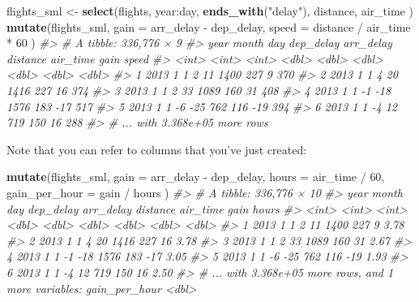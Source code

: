 \documentclass[]{book}
\newenvironment{Shaded}{\begin{snugshade}}{\end{snugshade}}
\newcommand{\KeywordTok}[1]{\textcolor[rgb]{0.13,0.29,0.53}{\textbf{{#1}}}}
\newcommand{\DataTypeTok}[1]{\textcolor[rgb]{0.13,0.29,0.53}{{#1}}}
\newcommand{\DecValTok}[1]{\textcolor[rgb]{0.00,0.00,0.81}{{#1}}}
\newcommand{\StringTok}[1]{\textcolor[rgb]{0.31,0.60,0.02}{{#1}}}
\newcommand{\CommentTok}[1]{\textcolor[rgb]{0.56,0.35,0.01}{\textit{{#1}}}}
\newcommand{\NormalTok}[1]{{#1}}
\begin{document}
\begin{Shaded}
\begin{Highlighting}[]
\NormalTok{flights_sml <-}\StringTok{ }\KeywordTok{select}\NormalTok{(flights, }
  \NormalTok{year:day, }
  \KeywordTok{ends_with}\NormalTok{(}\StringTok{"delay"}\NormalTok{), }
  \NormalTok{distance, }
  \NormalTok{air_time}
\NormalTok{)}
\KeywordTok{mutate}\NormalTok{(flights_sml,}
  \DataTypeTok{gain =} \NormalTok{arr_delay -}\StringTok{ }\NormalTok{dep_delay,}
  \DataTypeTok{speed =} \NormalTok{distance /}\StringTok{ }\NormalTok{air_time *}\StringTok{ }\DecValTok{60}
\NormalTok{)}
\CommentTok{#> # A tibble: 336,776 × 9}
\CommentTok{#>    year month   day dep_delay arr_delay distance air_time  gain speed}
\CommentTok{#>   <int> <int> <int>     <dbl>     <dbl>    <dbl>    <dbl> <dbl> <dbl>}
\CommentTok{#> 1  2013     1     1         2        11     1400      227     9   370}
\CommentTok{#> 2  2013     1     1         4        20     1416      227    16   374}
\CommentTok{#> 3  2013     1     1         2        33     1089      160    31   408}
\CommentTok{#> 4  2013     1     1        -1       -18     1576      183   -17   517}
\CommentTok{#> 5  2013     1     1        -6       -25      762      116   -19   394}
\CommentTok{#> 6  2013     1     1        -4        12      719      150    16   288}
\CommentTok{#> # ... with 3.368e+05 more rows}
\end{Highlighting}
\end{Shaded}

Note that you can refer to columns that you've just created:

\begin{Shaded}
\begin{Highlighting}[]
\KeywordTok{mutate}\NormalTok{(flights_sml,}
  \DataTypeTok{gain =} \NormalTok{arr_delay -}\StringTok{ }\NormalTok{dep_delay,}
  \DataTypeTok{hours =} \NormalTok{air_time /}\StringTok{ }\DecValTok{60}\NormalTok{,}
  \DataTypeTok{gain_per_hour =} \NormalTok{gain /}\StringTok{ }\NormalTok{hours}
\NormalTok{)}
\CommentTok{#> # A tibble: 336,776 × 10}
\CommentTok{#>    year month   day dep_delay arr_delay distance air_time  gain hours}
\CommentTok{#>   <int> <int> <int>     <dbl>     <dbl>    <dbl>    <dbl> <dbl> <dbl>}
\CommentTok{#> 1  2013     1     1         2        11     1400      227     9  3.78}
\CommentTok{#> 2  2013     1     1         4        20     1416      227    16  3.78}
\CommentTok{#> 3  2013     1     1         2        33     1089      160    31  2.67}
\CommentTok{#> 4  2013     1     1        -1       -18     1576      183   -17  3.05}
\CommentTok{#> 5  2013     1     1        -6       -25      762      116   -19  1.93}
\CommentTok{#> 6  2013     1     1        -4        12      719      150    16  2.50}
\CommentTok{#> # ... with 3.368e+05 more rows, and 1 more variables: gain_per_hour <dbl>}
\end{Highlighting}
\end{Shaded}
\end{document}
